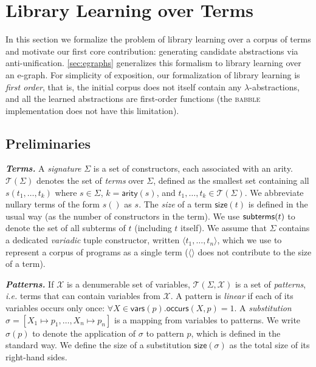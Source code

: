 \documentclass[acmsmall,screen,nonacm,review=false,timestamp=false]{acmart}
\newcommand{\ie}{\emph{i.e.}\xspace}
\newcommand{\emphbf}[1]{\emph{\textbf{#1}\xspace}}
\newcommand{\mypara}[1]{\smallskip\noindent\emphbf{#1.}\xspace}
\newcommand{\tname}[1]{\textsc{#1}\xspace}
\newcommand{\tool}{\tname{babble}}
\newcommand{\fv}{\mathsf{vars}}
\newcommand{\sz}{\mathsf{size}}
\newcommand{\arity}{\mathsf{arity}}
\newcommand{\termsof}[1]{\mathcal{T}(#1)}
\newcommand{\patsof}[2]{\mathcal{T}(#1,#2)}
\newcommand{\subst}[2]{{#1} \mapsto {#2}}
\newcommand{\sapp}[2]{{#1}({#2})}
\newcommand{\occ}{\mathsf{occurs}}
\begin{document}
 \section{Library Learning over Terms}\label{sec:au}

In this section
  we formalize the problem of
  library learning over a corpus of terms and
  motivate our first core contribution:
  generating candidate abstractions via anti-unification.
\autoref{sec:egraphs} generalizes this formalism to library learning over an e-graph.
For simplicity of exposition,
our formalization of library learning is \emph{first order},
that is, the initial corpus does not itself contain any $\lambda$-abstractions,
and all the learned abstractions are first-order functions
(the \tool implementation does not have this limitation).



\subsection{Preliminaries}

\mypara{Terms}
A \emph{signature} $\Sigma$ is a set of constructors,
each associated with an arity.
$\termsof{\Sigma}$ denotes the set of \emph{terms} over $\Sigma$,
defined as the smallest set containing all $s(t_1,\dots,t_k)$
where $s \in \Sigma$, $k = \arity(s)$, and $t_1,\dots,t_k\in\termsof{\Sigma}$.
We abbreviate nullary terms of the form $s()$ as $s$.
The \emph{size} of a term $\sz(t)$ is defined in the usual way
(as the number of constructors in the term).
We use $\mathsf{subterms}(t)$ to denote the set of all subterms of $t$ (including $t$ itself).
We assume that $\Sigma$ contains a dedicated \emph{variadic} tuple constructor,
written $\langle t_1, \ldots, t_n \rangle$,
which we use to represent a corpus of programs as a single term
($\langle \rangle$ does not contribute to the size of a term).

\mypara{Patterns}
If $\mathcal{X}$ is a denumerable set of variables,
$\patsof{\Sigma}{\mathcal{X}}$ is a set of \emph{patterns},
\ie terms that can contain variables from $\mathcal{X}$.
A pattern is \emph{linear} if each of its variables occurs only once:
$\forall X \in \fv(p) . \occ(X, p) = 1$.
A \emph{substitution} $\sigma = [\subst{X_1}{p_1}, \ldots, \subst{X_n}{p_n}]$
is a mapping from variables to patterns.
We write $\sapp{\sigma}{p}$ to denote the application of $\sigma$ to pattern $p$,
which is defined in the standard way.
We define the size of a substitution $\sz(\sigma)$ as the total size of its right-hand sides.
\end{document}
